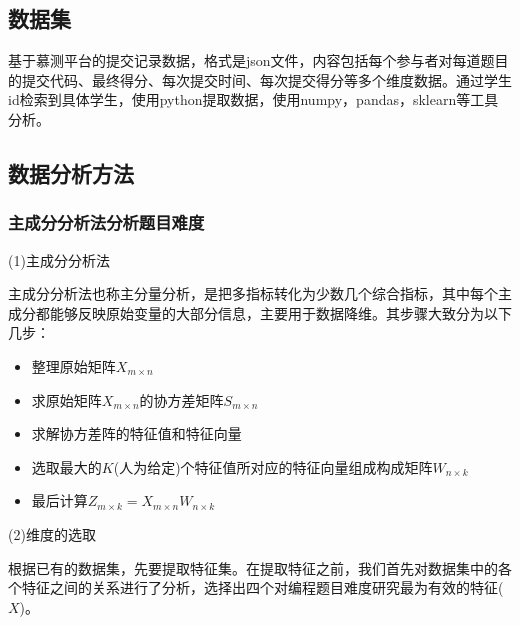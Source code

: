 \documentclass[UTF8]{ctexart}
\begin{document}
	\subsection{数据集}
	基于慕测平台的提交记录数据，格式是json文件，内容包括每个参与者对每道题目的提交代码、最终得分、每次提交时间、每次提交得分等多个维度数据。通过学生id检索到具体学生，使用python提取数据，使用numpy，pandas，sklearn等工具分析。	
	
	\subsection{数据分析方法}
	
	\subsubsection{主成分分析法分析题目难度}
	\par (1)主成分分析法
	\par 主成分分析法也称主分量分析，是把多指标转化为少数几个综合指标，其中每个主成分都能够反映原始变量的大部分信息，主要用于数据降维。其步骤大致分为以下几步：
	\begin{itemize}
		\item 整理原始矩阵$X_{m \times n}$
		\item 求原始矩阵$X_{m \times n}$的协方差矩阵$S_{m \times n}$
		\item 求解协方差阵的特征值和特征向量
		\item 选取最大的$K$(人为给定)个特征值所对应的特征向量组成构成矩阵$W_{n \times k}$
		\item 最后计算$Z_{m \times k}=X_{m \times n}W_{n \times k}$
	\end{itemize}
	\par (2)维度的选取
	\par 根据已有的数据集，先要提取特征集。在提取特征之前，我们首先对数据集中的各个特征之间的关系进行了分析，选择出四个对编程题目难度研究最为有效的特征($X$)。
	\par
\end{document}
